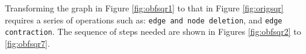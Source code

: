 \documentclass[twocolumn]{article}
\begin{document}
Transforming the graph in Figure \ref{fig:obfsqr1} to that in Figure \ref{fig:origsqr} requires a series of operations such as: {\tt edge and node deletion}, and {\tt edge contraction}. 
The sequence of steps needed are shown in Figures \ref{fig:obfsqr2} to \ref{fig:obfsqr7}.
\begin{figure}[ht!]
 \centering
\end{figure}
\end{document}
